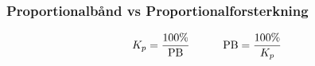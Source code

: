 \documentclass[aspectratio=169,xcolor=dvipsnames]{beamer}
\begin{document}
%
%
\begin{frame}
	\frametitle{Proportionalbånd vs Proportionalforsterkning}

$$K_p = {100\% \over \hbox{PB}} \hskip 30pt \hbox{PB} = {100\% \over K_p}$$
\end{frame}
\end{document}
